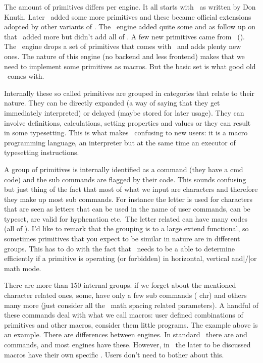 The amount of primitives differs per engine. It all starts with \TEX\ as written
by Don Knuth. Later \ETEX\ added some more primitives and these became official
extensions adopted by other variants of \TEX. The \PDFTEX\ engine added quite
some and as follow up on that \LUATEX\ added more but didn't add all of \PDFTEX.
A few new primitives came from \OMEGA\ (\ALEPH). The \LUAMETATEX\ engine drops a
set of primitives that comes with \LUATEX\ and adds plenty new ones. The nature
of this engine (no backend and less frontend) makes that we need to implement
some primitives as macros. But the basic set is what good old \TEX\ comes with.

Internally these so called primitives are grouped in categories that relate to
their nature. They can be directly expanded (a way of saying that they get
immediately interpreted) or delayed (maybe stored for later usage). They can
involve definitions, calculations, setting properties and values or they can
result in some typesetting. This is what makes \TEX\ confusing to new users: it
is a macro programming language, an interpreter but at the same time an executor
of typesetting instructions.

A group of primitives is internally identified as a command (they have a \type
{cmd} code) and the sub commands are flagged by their  code. This
sounds confusing but just thing of the fact that most of what we input are
characters and therefore they make up most sub commands. For instance the \quote
{letter } is used for characters that are seen as letters that can be
used in the name of user commands, can be typeset, are valid for hyphenation
etc.\ The letter related  can have many  codes (all of
\UNICODE). I'd like to remark that the grouping is to a large extend functional,
so sometimes primitives that you expect to be similar in nature are in different
groups. This has to do with the fact that \TEX\ needs to be a able to determine
efficiently if a primitive is operating (or forbidden) in horizontal, vertical
and|/|or math mode.

There are more than 150 internal  groups. if we forget about the
mentioned character related ones, some, have only a few sub commands (\type
{chr}) and others many more (just consider all the \OPENTYPE\ math spacing
related parameters). A handful of these commands deal with what we call macros:
user defined combinations of primitives and other macros, consider them little
programs. The \type {\MyMacro} example above is an example. There are differences
between engines. In standard \TEX\ there are \type {\outer} and \type {\long}
commands, and most engines have these. However, in \LUAMETATEX\ the later to be
discussed \type {\protected} macros have their own specific . Users don't need to bother about this.

